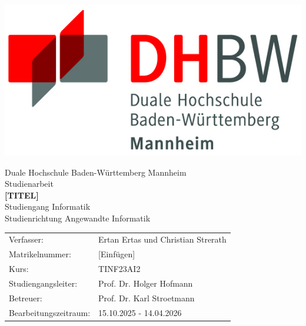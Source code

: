 
\begin{titlepage}
	\hfill \includegraphics{./img/logo.jpg}
	\begin{center}
		\vspace*{1cm}
		{\large Duale Hochschule Baden-Württemberg Mannheim}\\
		\vspace*{1.5cm}
		{\Large Studienarbeit}\\
		\vspace{0.5cm}
		{\LARGE \textbf{[TITEL]}}\\
		\vspace*{1.5cm}
		{\Large Studiengang Informatik}\\
		\vspace{0.5cm}
		{\large Studienrichtung Angewandte Informatik}
		\vfill
		{\normalsize \begin{tabular}{ l l }
				Verfasser: & Ertan Ertas und Christian Strerath \\
				Matrikelnummer: & [Einfügen] \\
				Kurs: & TINF23AI2 \\
				Studiengangsleiter: & Prof. Dr. Holger Hofmann \\
				Betreuer: & Prof. Dr. Karl Stroetmann \\
				Bearbeitungszeitraum: & 15.10.2025 - 14.04.2026
		\end{tabular}}
	\end{center}
	\vfill 
\end{titlepage}
